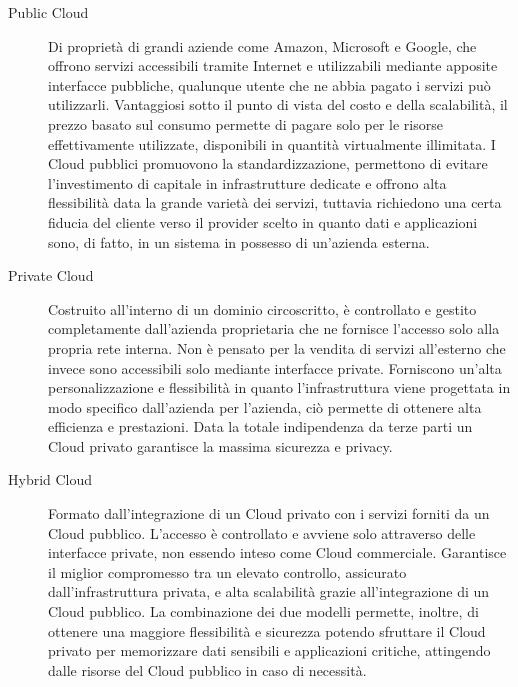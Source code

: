 \begin{description}
    \item[Public Cloud]Di proprietà di grandi aziende come Amazon, Microsoft e Google, che offrono servizi accessibili tramite Internet e utilizzabili mediante apposite interfacce pubbliche, qualunque utente che ne abbia pagato i servizi può utilizzarli. Vantaggiosi sotto il punto di vista del costo e della scalabilità, il prezzo basato sul consumo permette di pagare solo per le risorse effettivamente utilizzate, disponibili in quantità virtualmente illimitata. I Cloud pubblici promuovono la standardizzazione, permettono di evitare l’investimento di capitale in infrastrutture dedicate e offrono alta flessibilità data la grande varietà dei servizi, tuttavia richiedono una certa fiducia del cliente verso il provider scelto in quanto dati e applicazioni sono, di fatto, in un sistema in possesso di un’azienda esterna.
    
    \item[Private Cloud]Costruito all’interno di un dominio circoscritto, è controllato e gestito completamente dall’azienda proprietaria che ne fornisce l’accesso solo alla propria rete interna. Non è pensato per la vendita di servizi all’esterno che invece sono accessibili solo mediante interfacce private. Forniscono un’alta personalizzazione e flessibilità in quanto l’infrastruttura viene progettata in modo specifico dall’azienda per l’azienda, ciò permette di ottenere alta efficienza e prestazioni. Data la totale indipendenza da terze parti un Cloud privato garantisce la massima sicurezza e privacy.

    \item[Hybrid Cloud]Formato dall’integrazione di un Cloud privato con i servizi forniti da un Cloud pubblico. L’accesso è controllato e avviene solo attraverso delle interfacce private, non essendo inteso come Cloud commerciale. Garantisce il miglior compromesso tra un elevato controllo, assicurato dall’infrastruttura privata, e alta scalabilità grazie all’integrazione di un Cloud pubblico. La combinazione dei due modelli permette, inoltre, di ottenere una maggiore flessibilità e sicurezza potendo sfruttare il Cloud privato per memorizzare dati sensibili e applicazioni critiche, attingendo dalle risorse del Cloud pubblico in caso di necessità.
\end{description}

